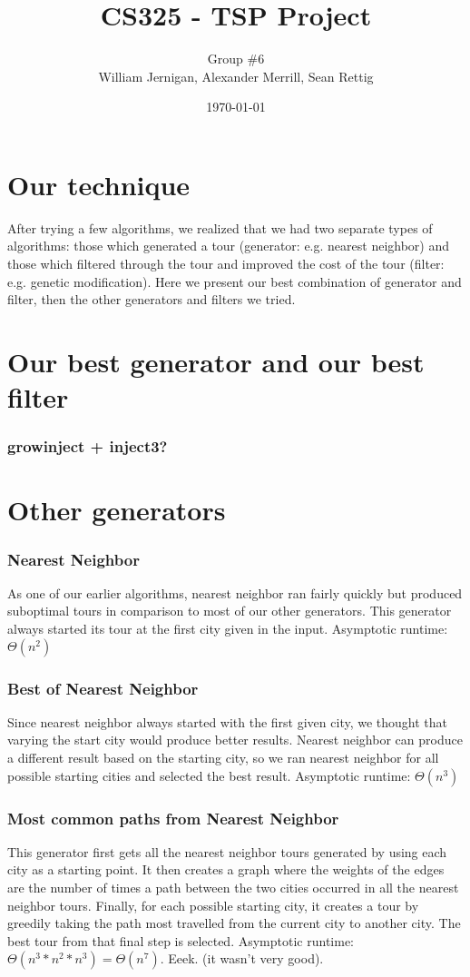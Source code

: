\documentclass{article}
\title{CS325 - TSP Project}
\author{Group \#6 \\ William Jernigan, Alexander Merrill, Sean Rettig}
\date{\today}
\begin{document}
\maketitle
\part*{Our technique}
After trying a few algorithms, we realized that we had two separate types of algorithms: those which generated a tour (generator: e.g. nearest neighbor) and those which filtered through the tour and improved the cost of the tour (filter: e.g. genetic modification). Here we present our best combination of generator and filter, then the other generators and filters we tried.
\part*{Our best generator and our best filter}
\section*{growinject + inject3?}%

\part*{Other generators}

\section*{Nearest Neighbor}%
As one of our earlier algorithms, nearest neighbor ran fairly quickly but produced suboptimal tours in comparison to most of our other generators. This generator always started its tour at the first city given in the input. Asymptotic runtime: $\Theta (n^2)$

\section*{Best of Nearest Neighbor}%
Since nearest neighbor always started with the first given city, we thought that varying the start city would produce better results. Nearest neighbor can produce a different result based on the starting city, so we ran nearest neighbor for all possible starting cities and selected the best result. Asymptotic runtime: $\Theta (n^3)$

\section*{Most common paths from Nearest Neighbor}%
This generator first gets all the nearest neighbor tours generated by using each city as a starting point. It then creates a graph where the weights of the edges are the number of times a path between the two cities occurred in all the nearest neighbor tours. Finally, for each possible starting city, it creates a tour by greedily taking the path most travelled from the current city to another city. The best tour from that final step is selected. Asymptotic runtime: $\Theta (n^3 * n^2 * n^3) = \Theta (n^7)$. Eeek. (it wasn't very good).
\end{document}
